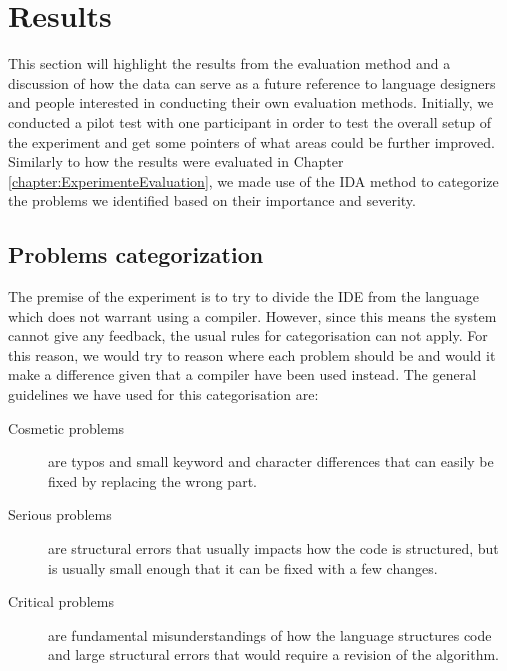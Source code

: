 \chapter{Results}
\label{chapter:Results}

This section will highlight the results from the evaluation method and a discussion of how the data can serve as a future reference to language designers and people interested in conducting their own evaluation methods. Initially, we conducted a pilot test with one participant in order to test the overall setup of the experiment and get some pointers of what areas could be further improved. Similarly to how the results were evaluated in Chapter \ref{chapter:ExperimenteEvaluation}, we made use of the IDA method \cite{IDA} to categorize the problems we identified based on their importance and severity. 



\section{Problems categorization}
The premise of the experiment is to try to divide the IDE from the language which does not warrant using a compiler.
However, since this means the system cannot give any feedback, the usual rules for categorisation can not apply.
For this reason, we would try to reason where each problem should be and would it make a difference given that a compiler have been used instead.
The general guidelines we have used for this categorisation are:
\begin{description}
\item[Cosmetic problems] are typos and small keyword and character differences that can easily be fixed by replacing the wrong part.
\item[Serious problems] are structural errors that usually impacts how the code is structured, but is usually small enough that it can be fixed with a few changes.
\item[Critical problems] are fundamental misunderstandings of how the language structures code and large structural errors that would require a revision of the algorithm.
\end{description}

